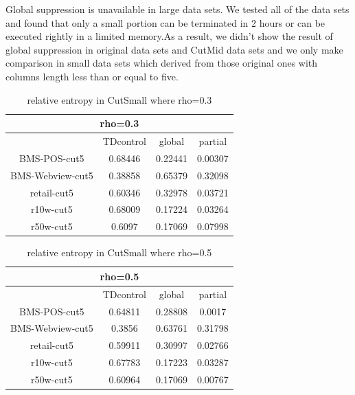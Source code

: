 \documentclass{article}
\begin{document}
Global suppression is unavailable in large data sets. We tested all of the data sets and found that only a small portion can be terminated in 2 hours or can be executed rightly in a limited memory.As a result, we didn't show the result of global suppression in original data sets and CutMid data sets and we only make comparison in small data sets which derived from those original ones with columns length less than or equal to five.



\begin{table}
\begin{tabular}{|c|c|c|c|}
  \hline
   \multicolumn{4}{|c|}{rho=0.3}\\
  \hline
  &TDcontrol & global & partial \\\hline
  BMS-POS-cut5 & 0.68446&0.22441&0.00307 \\\hline
  BMS-Webview-cut5 &0.38858 &0.65379 &0.32098\\\hline
   retail-cut5 & 0.60346 & 0.32978 & 0.03721 \\\hline
  r10w-cut5 & 0.68009 & 0.17224 & 0.03264 \\\hline
  r50w-cut5 & 0.6097 & 0.17069 & 0.07998 \\\hline
\end{tabular}
\caption{ relative entropy in CutSmall where rho=0.3}
\end{table}





\begin{table}
\begin{tabular}{|c|c|c|c|}
  \hline
   \multicolumn{4}{|c|}{rho=0.5}\\
  \hline
  &TDcontrol & global & partial \\\hline
  BMS-POS-cut5 & 0.64811&0.28808& 0.0017 \\\hline
  BMS-Webview-cut5 &0.3856&0.63761 &0.31798\\\hline
   retail-cut5 &0.59911 & 0.30997&0.02766 \\\hline
  r10w-cut5 &0.67783& 0.17223& 0.03287 \\\hline
  r50w-cut5 & 0.60964 & 0.17069 & 0.00767 \\\hline
\end{tabular}
 \caption{ relative entropy in CutSmall where rho=0.5}
\end{table}
\end{document}
